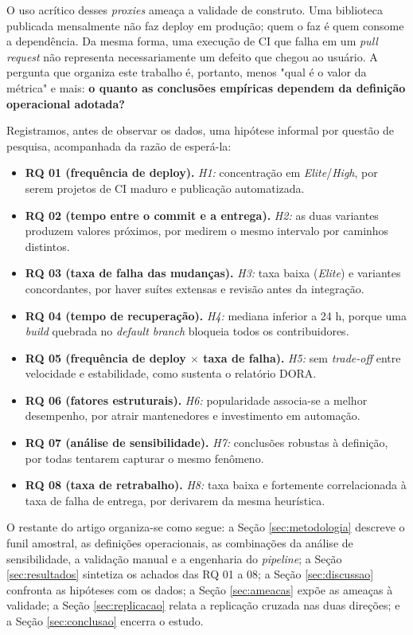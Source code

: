 \documentclass[12pt]{article}
\begin{document}
O uso acrítico desses \emph{proxies} ameaça a validade de construto. Uma biblioteca
publicada mensalmente não faz deploy em produção; quem o faz é quem consome a dependência.
Da mesma forma, uma execução de CI que falha em um \emph{pull request} não representa
necessariamente um defeito que chegou ao usuário. A pergunta que organiza este trabalho é,
portanto, menos "qual é o valor da métrica" e mais: \textbf{o quanto as conclusões empíricas
dependem da definição operacional adotada?}

Registramos, antes de observar os dados, uma hipótese informal por questão de pesquisa,
acompanhada da razão de esperá-la:

\begin{itemize}
  \item \textbf{RQ 01 (frequência de deploy).} \emph{H1:} concentração em \emph{Elite}/\emph{High}, por serem
    projetos de CI maduro e publicação automatizada.
  \item \textbf{RQ 02 (tempo entre o commit e a entrega).} \emph{H2:} as duas variantes produzem valores próximos, por
    medirem o mesmo intervalo por caminhos distintos.
  \item \textbf{RQ 03 (taxa de falha das mudanças).} \emph{H3:} taxa baixa (\emph{Elite}) e variantes concordantes,
    por haver suítes extensas e revisão antes da integração.
  \item \textbf{RQ 04 (tempo de recuperação).} \emph{H4:} mediana inferior a 24 h, porque uma
    \emph{build} quebrada no \emph{default branch} bloqueia todos os contribuidores.
  \item \textbf{RQ 05 (frequência de deploy $\times$ taxa de falha).} \emph{H5:} sem \emph{trade-off} entre velocidade e
    estabilidade, como sustenta o relatório DORA.
  \item \textbf{RQ 06 (fatores estruturais).} \emph{H6:} popularidade associa-se a melhor desempenho,
    por atrair mantenedores e investimento em automação.
  \item \textbf{RQ 07 (análise de sensibilidade).} \emph{H7:} conclusões robustas à definição, por todas
    tentarem capturar o mesmo fenômeno.
  \item \textbf{RQ 08 (taxa de retrabalho).} \emph{H8:} taxa baixa e fortemente correlacionada à taxa de falha
    de entrega, por derivarem da mesma heurística.
\end{itemize}

O restante do artigo organiza-se como segue: a Seção \ref{sec:metodologia} descreve o funil
amostral, as definições operacionais, as combinações da análise de sensibilidade, a
validação manual e a engenharia do \emph{pipeline}; a Seção \ref{sec:resultados} sintetiza
os achados das RQ 01 a 08; a Seção \ref{sec:discussao} confronta as hipóteses com os dados;
a Seção \ref{sec:ameacas} expõe as ameaças à validade; a Seção \ref{sec:replicacao} relata a
replicação cruzada nas duas direções; e a Seção \ref{sec:conclusao} encerra o estudo.
\end{document}
